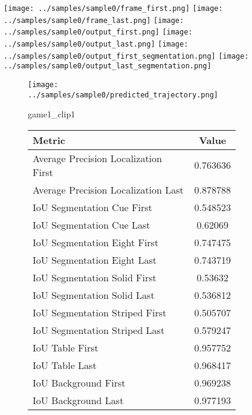 

\begin{figure}
\texttt{[image: ../samples/sample0/frame\_first.png]}
\texttt{[image: ../samples/sample0/frame\_last.png]}
\newline
\texttt{[image: ../samples/sample0/output\_first.png]}
\texttt{[image: ../samples/sample0/output\_last.png]}
\newline
\texttt{[image: ../samples/sample0/output\_first\_segmentation.png]}
\texttt{[image: ../samples/sample0/output\_last\_segmentation.png]}
\newline
\begin{subfigure}[b]{0.49\textwidth}
    \vspace{20pt}
    \texttt{[image: ../samples/sample0/predicted\_trajectory.png]}
    \caption*{game1\_clip1}
\end{subfigure}
\begin{subfigure}[b]{0.49\textwidth}
\begin{tabular}{|l|c|}
    \hline
    \textbf{Metric} & \textbf{Value} \\
    \hline
    Average Precision Localization First & 0.763636 \\
    Average Precision Localization Last & 0.878788 \\
    \hline
    IoU Segmentation Cue First & 0.548523 \\
    IoU Segmentation Cue Last & 0.62069 \\
    IoU Segmentation Eight First & 0.747475 \\
    IoU Segmentation Eight Last & 0.743719 \\
    IoU Segmentation Solid First & 0.53632 \\
    IoU Segmentation Solid Last & 0.536812 \\
    IoU Segmentation Striped First & 0.505707 \\
    IoU Segmentation Striped Last & 0.579247 \\
    \hline
    IoU Table First & 0.957752 \\
    IoU Table Last & 0.968417 \\
    IoU Background First & 0.969238 \\
    IoU Background Last & 0.977193 \\

\end{tabular}
\end{subfigure}
\end{figure}
